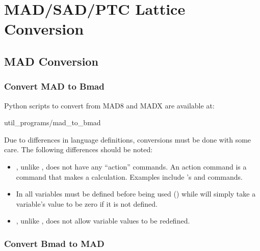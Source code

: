 \chapter{MAD/SAD/PTC Lattice Conversion}
\label{c:lat.convert}

\section{MAD Conversion}
\label{s:mad.convert}

\subsection{Convert MAD to Bmad}
\label{s:mad.bmad.uap}

Python scripts to convert from MAD8 and MADX are available at:
\begin{example}
  util_programs/mad_to_bmad
\end{example}
Due to differences in language definitions, conversions must be done with some care. The following
differences should be noted:
  \begin{itemize}
  \item
\bmad, unlike \mad, does not have any ``action'' commands. An action command is a command that makes
a calculation. Examples include \mad's  and  commands.
  \item
In \bmad all variables must be defined before being used () while \mad will simply take
a variable's value to be zero if it is not defined.
  \item
\bmad, unlike \mad, does not allow variable values to be redefined.
  \end{itemize}

\subsection{Convert Bmad to MAD}
\label{s:bmad.mad}

